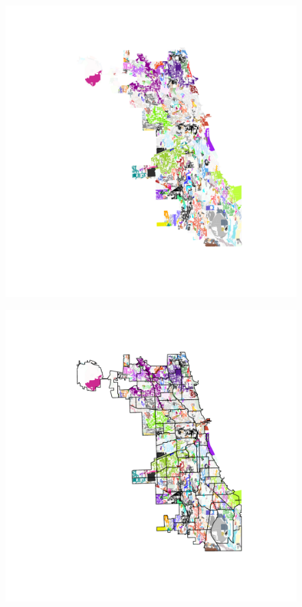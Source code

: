 \documentclass[12pt,letter]{article}\usepackage[]{graphicx}\usepackage[]{color}
\begin{document}
\begin{figure}
\includegraphics{../code/training/predicted_chicago_neighborhoods.pdf}
\end{figure}


\begin{figure}
\includegraphics{../code/training/predicted_chicago_neighborhoods_ca.pdf}
\end{figure}
\end{document}
